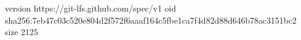 version https://git-lfs.github.com/spec/v1
oid sha256:7eb47c03c520e804d2f572f6aaaf164c5fbe1ca7f4d82d88d646b78ac3151bc2
size 2125
